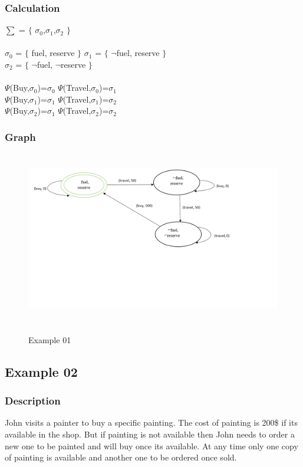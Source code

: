 \documentclass[11pt]{article}
\begin{document}
	\subsubsection{Calculation}\label{par:p301}\par
	$\sum$ = $\lbrace$ $\sigma_{0}$,$\sigma_{1}$,$\sigma_{2}$ $\rbrace$\\ \\
	$\sigma_{0}$ = $\lbrace$ fuel, reserve $\rbrace$ \indent $\sigma_{1}$ = $\lbrace$ $\neg$fuel, reserve $\rbrace$\\
	$\sigma_{2}$ = $\lbrace$ $\neg$fuel, $\neg$reserve $\rbrace$ 
	\\ \\
	$\Psi$(Buy,$\sigma_{0}$)=$\sigma_{0}$ \indent $\Psi$(Travel,$\sigma_{0}$)=$\sigma_{1}$\\
	$\Psi$(Buy,$\sigma_{1}$)=$\sigma_{1}$ \indent $\Psi$(Travel,$\sigma_{1}$)=$\sigma_{2}$\\
	$\Psi$(Buy,$\sigma_{2}$)=$\sigma_{1}$ \indent $\Psi$(Travel,$\sigma_{2}$)=$\sigma_{2}$\\
	\subsubsection{Graph}\label{par:p401}
	\begin{figure}[H]
		\centering
		\includegraphics[width=6in,height=3in]{./media/Ex01 (2).png}
		\label{Figure:f01}
		\caption{Example 01}
	\end{figure}
	\subsection{Example 02}\label{example:ex02}
	\subsubsection{Description}\label{par:p102}
	John visits a painter to buy a specific painting. The cost of painting is 200\$ if its available in the shop. But if painting is not available then John needs to order a new one to be painted and will buy once its available. At any time only one copy of painting is available and another one to be ordered once sold. 
	
\end{document}
